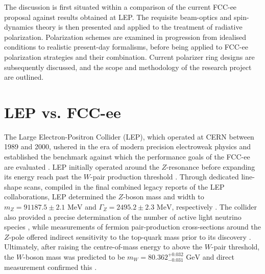 \documentclass[%
 aip,
 amsmath,amssymb,
 reprint,%
superscriptaddress
]{revtex4-2}
\begin{document}
The discussion is first situated within a comparison of the current FCC-ee proposal against results obtained at LEP.
The requisite beam-optics and spin-dynamics theory is then presented and applied to the treatment of radiative polarization.
Polarization schemes are examined in progression from idealised conditions to realistic present-day formalisms, before being applied to FCC-ee polarization strategies and their combination.
Current polarizer ring designs are subsequently discussed, and the scope and methodology of the research project are outlined.

\section{LEP vs. FCC-ee}

The Large Electron-Positron Collider (LEP), which operated at CERN between 1989 and 2000, ushered in the era of modern precision electroweak physics and established the benchmark against which the performance goals of the FCC-ee are evaluated \cite{dam_precision_2016}. LEP initially operated around the $Z$-resonance before expanding its energy reach past the $W$-pair production threshold \cite{the_fcc_collaboration_fcc-ee_2019}. Through dedicated line-shape scans, compiled in the final combined legacy reports of the LEP collaborations, LEP determined the $Z$-boson mass and width to $m_Z = 91187.5 \pm 2.1\text{ MeV}$ and $\Gamma_Z = 2495.2 \pm 2.3\text{ MeV}$, respectively \cite{the_fcc_collaboration_fcc-ee_2019, LEP_precision_2006}. The collider also provided a precise determination of the number of active light neutrino species \cite{dam_precision_2016}, while measurements of fermion pair-production cross-sections around the $Z$-pole offered indirect sensitivity to the top-quark mass prior to its discovery \cite{the_fcc_collaboration_fcc-ee_2019}. Ultimately, after raising the centre-of-mass energy to above the $W$-pair threshold, the $W$-boson mass was predicted to be $m_W = 80.362^{+0.032}_{-0.031}\text{ GeV}$ and direct measurement confirmed this \cite{the_fcc_collaboration_fcc-ee_2019}.
\end{document}
